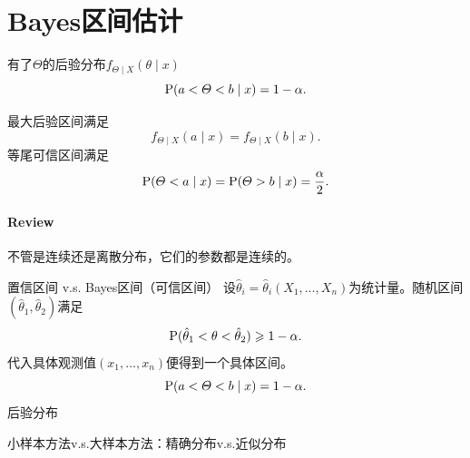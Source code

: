 \section{Bayes区间估计}
有了$\varTheta$的后验分布$f_{\varTheta\mid X}(\theta \mid x)$
\begin{equation}\label{eq:ps-credible-interval}
	\P(a < \varTheta < b \mid x) = 1 - \alpha.
\end{equation}

最大后验区间满足
\[
	f_{\varTheta\mid X}(a \mid x) = f_{\varTheta\mid X}(b \mid x).
\]
等尾可信区间满足
\begin{equation}\label{eq:ps-equal-tailed-credible-interval}
	\P(\varTheta < a \mid x) = \P(\varTheta > b \mid x) = \frac\alpha{2}.
\end{equation}
\paragraph{Review}
\begin{compactenum}
	\item 不管是连续还是离散分布，它们的参数都是连续的。
	\item 置信区间 v.s. Bayes区间（可信区间）
	设$\hat\theta_i = \hat\theta_i(X_1,\ldots,X_n)$为统计量。随机区间$(\hat\theta_1,\hat\theta_2)$满足
	\[
		\P(\hat\theta_1 < \theta < \hat\theta_2) \geqslant 1 - \alpha.
	\]
	代入具体观测值$(x_1,\ldots,x_n)$便得到一个具体区间。
	\[
		\P(a < \varTheta < b \mid x) = 1 - \alpha.
	\]
	后验分布
	\item 小样本方法v.s.大样本方法：精确分布v.s.近似分布
\end{compactenum}

